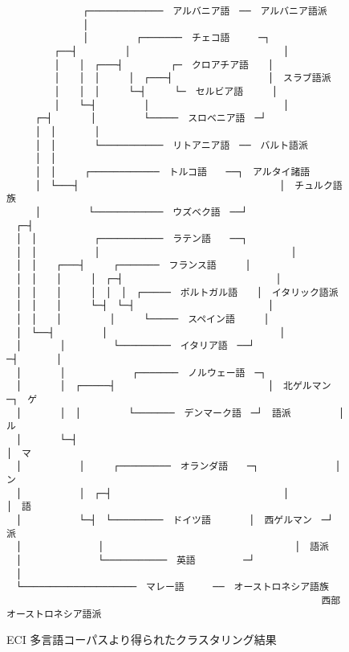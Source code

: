 \begin{figure}[p]
\setlength{\baselineskip}{0.25\baselineskip}
\begin{small}
\begin{center}
\begin{verbatim}
　　　　　　　　┌─────────────　アルバニア語　──　アルバニア語派
　　　　　　　　│
　　　　　　　　│　　　　　┌───────　チェコ語　　　─┐
　　　　　┌──┤　　　　　│　　　　　　　　　　　　　　　　│
　　　　　│　　│　┌───┤　　　　　┌─　クロアチア語　　│
　　　　　│　　│　│　　　│　┌───┤　　　　　　　　　　│　スラブ語派
　　　　　│　　│　│　　　└─┤　　　└─　セルビア語　　　│
　　　　　│　　└─┤　　　　　│　　　　　　　　　　　　　　│
　　　┌─┤　　　　│　　　　　└─────　スロベニア語　─┘　
　　　│　│　　　　│　
　　　│　│　　　　└───────────　リトアニア語　──　バルト語派
　　　│　│　
　　　│　│　　　┌────────────　トルコ語　　──┐　アルタイ諸語
　　　│　└───┤　　　　　　　　　　　　　　　　　　　　　│　チュルク語族
　　　│　　　　　└────────────　ウズベク語　──┘
　┌─┤
　│　│　　　　　　┌───────────　ラテン語　　──┐
　│　│　　　　　　│　　　　　　　　　　　　　　　　　　　　│
　│　│　　┌───┤　　　┌───────　フランス語　　　│
　│　│　　│　　　│　┌─┤　　　　　　　　　　　　　　　　│
　│　│　　│　　　│　│　│　┌─────　ポルトガル語　　│　イタリック語派
　│　│　　│　　　└─┤　└─┤　　　　　　　　　　　　　　│
　│　│　　│　　　　　│　　　└─────　スペイン語　　　│
　│　└──┤　　　　　│　　　　　　　　　　　　　　　　　　│
　│　　　　│　　　　　└─────────　イタリア語　──┘
─┤　　　　│　
　│　　　　│　　　　　　　┌───────　ノルウェー語　─┐
　│　　　　│　┌─────┤　　　　　　　　　　　　　　　　│　北ゲルマン　─┐　ゲ
　│　　　　│　│　　　　　└───────　デンマーク語　─┘　語派　　　　　│　ル
　│　　　　└─┤　　　　　　　　　　　　　　　　　　　　　　　　　　　　　　　│　マ
　│　　　　　　│　　　┌─────────　オランダ語　　─┐　　　　　　　　│　ン
　│　　　　　　│　┌─┤　　　　　　　　　　　　　　　　　　│　　　　　　　　│　語
　│　　　　　　└─┤　└─────────　ドイツ語　　　　│　西ゲルマン　─┘　派
　│　　　　　　　　│　　　　　　　　　　　　　　　　　　　　│　語派
　│　　　　　　　　└───────────　英語　　　　　─┘
　│　
　└────────────────────　マレー語　　　──　オーストロネシア語族
　　　　　　　　　　　　　　　　　　　　　　　　　　　　　　　　　西部オーストロネシア語派
\end{verbatim}
\end{center}
\end{small}
\caption{ECI 多言語コーパスより得られたクラスタリング結果} \label{Fig:ExprResult}
\end{figure}

